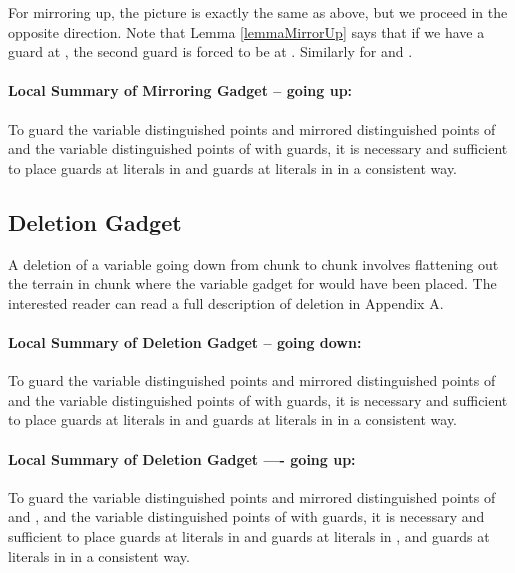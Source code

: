 \documentclass[11pt]{article}
\begin{document}
For mirroring up, the picture is exactly the same as above, but we proceed in the opposite direction. Note
that Lemma \ref{lemmaMirrorUp} says that if we have a guard at , the second guard is forced to be
at . Similarly for  and .

\paragraph{Local Summary of Mirroring Gadget -- going up:}  To guard the variable distinguished points and mirrored distinguished points of  and the variable distinguished points of  with  guards, it is necessary and sufficient to place  guards at literals in  and  guards at literals in  in a consistent way.




















\subsection{Deletion Gadget}

A deletion of a variable  going down from chunk  to chunk  involves flattening out the terrain in chunk  where the variable gadget for  would have been placed.  The interested reader can read a full description of deletion in Appendix A.

\paragraph{Local Summary of Deletion Gadget -- going down:}  To guard the variable distinguished points and mirrored distinguished points of  and the variable distinguished points of  with  guards, it is necessary and sufficient to place  guards at literals in  and  guards at
literals in  in a consistent way.

\paragraph{Local Summary of Deletion Gadget ---- going up:}  To guard the variable distinguished points and mirrored distinguished points of  and , and the variable distinguished points of  with  guards, it is necessary and sufficient to place  guards at literals in  and  guards at literals in , and  guards at literals in  in a consistent way.
\end{document}
